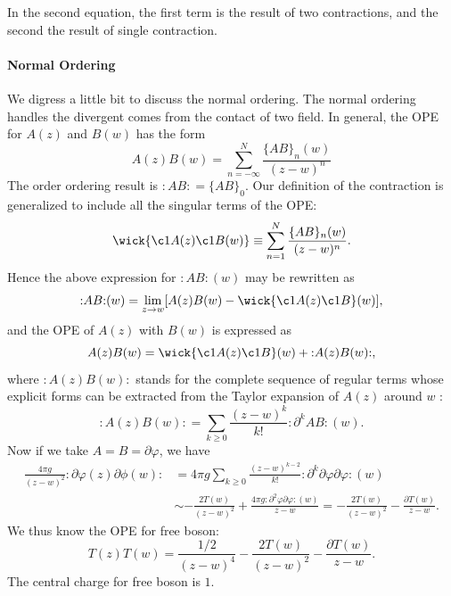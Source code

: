 \documentclass[aps,prb,superscriptaddress,nofootinbib]{revtex4}
\newcommand{\normord}[1]{{:\mathrel{#1}:}}
\begin{document}
In the second equation, the first term is the result of two contractions, and the second the result of single contraction.

\paragraph*{Normal Ordering}
We digress a little bit to discuss the normal ordering.
The normal ordering handles the divergent comes from the contact of two field.
In general, the OPE for $A(z)$ and $B(w)$ has the form
\begin{equation}
	A(z) B(w) = \sum_{n=-\infty}^N \frac{\{AB\}_n(w)}{(z-w)^n}
\end{equation}
The order ordering result is $\normord{AB}=\{AB\}_0$.
Our definition of the contraction is generalized to include all the singular terms of the OPE:
\begin{equation}
	\wick{\c1{A}(z) \c1{B} (w)} \equiv \sum_{n=1}^{N} \frac{\{A B\}_{n}(w)}{(z-w)^{n}}.
\end{equation}
Hence the above expression for $\normord{A B}(w)$ may be rewritten as
\begin{equation}
	\normord{A B}(w) = \lim _{z \rightarrow w}[A(z) B(w)- \wick{\c1 A(z) \c1 B}(w)],
\end{equation}
and the OPE of $A(z)$ with $B(w)$ is expressed as
\begin{equation}
	A(z) B(w) = \wick{\c1 A(z) \c1 B}(w)+ \normord{A(z) B(w)},
\end{equation}
where $\normord{A(z) B(w)}$ stands for the complete sequence of regular terms whose explicit forms can be extracted from the Taylor expansion of $A(z)$ around $w$ :
\begin{equation}
	\normord{A(z) B(w)} = \sum_{k \geq 0} \frac{(z-w)^{k}}{k !}\normord{\partial^{k} A B}(w).
\end{equation}
Now if we take $A=B=\partial\varphi$, we have
\begin{equation}
\begin{aligned}
	 \frac{4\pi g}{(z-w)^2} \normord{\partial\varphi(z) \partial\phi(w)} 
	 &= 4\pi g \sum_{k \geq 0} \frac{(z-w)^{k-2}}{k !}\normord{\partial^{k} \partial\varphi \partial\varphi}(w) \\
	 &\sim - \frac{2T(w)}{(z-w)^2} + \frac{4\pi g \normord{\partial^2\varphi \partial\varphi}(w)}{z-w} 
	 = - \frac{2T(w)}{(z-w)^2} - \frac{\partial T(w)}{z-w}.
\end{aligned}
\end{equation}
We thus know the OPE for free boson:
\begin{equation}
	T(z) T(w) = \frac{1/2}{(z-w)^4} - \frac{2T(w)}{(z-w)^2} - \frac{\partial T(w)}{z-w}.
\end{equation}
The central charge for free boson is $1$.
\end{document}
